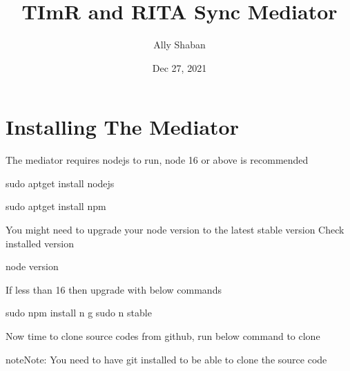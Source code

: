 \documentclass[letterpaper,10pt,english]{sphinxmanual}
\title{TImR and RITA Sync Mediator}
\date{Dec 27, 2021}
\author{Ally Shaban}
\begin{document}
\pagestyle{empty}
\sphinxmaketitle
\pagestyle{plain}
\sphinxtableofcontents
\pagestyle{normal}
\label{\detokenize{index::doc}}



\chapter{Installing The Mediator}
\label{\detokenize{install:installing-the-mediator}}\label{\detokenize{install::doc}}
\sphinxAtStartPar
{}

\sphinxAtStartPar
{}
The mediator requires nodejs to run, node 16 or above is recommended

\begin{sphinxVerbatim}[commandchars=\\\{\}]
sudo apt\PYGZhy{}get install nodejs
\end{sphinxVerbatim}

\sphinxAtStartPar
{}

\begin{sphinxVerbatim}[commandchars=\\\{\}]
sudo apt\PYGZhy{}get install npm
\end{sphinxVerbatim}

\sphinxAtStartPar
You might need to upgrade your node version to the latest stable version
Check installed version

\begin{sphinxVerbatim}[commandchars=\\\{\}]
node \PYGZhy{}\PYGZhy{}version
\end{sphinxVerbatim}

\sphinxAtStartPar
If less than 16 then upgrade with below commands

\begin{sphinxVerbatim}[commandchars=\\\{\}]
sudo npm install n \PYGZhy{}g
sudo n stable
\end{sphinxVerbatim}

\sphinxAtStartPar
Now time to clone source codes from github, run below command to clone

\begin{sphinxadmonition}{note}{Note:}
\sphinxAtStartPar
You need to have git installed to be able to clone the source code
\end{sphinxadmonition}
\end{document}
